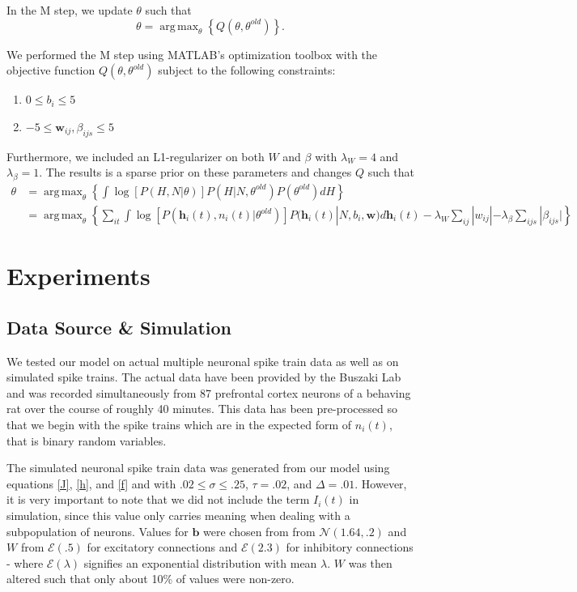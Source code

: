 \documentclass{article}
\DeclareMathOperator*{\argmax}{arg\,max}
\begin{document}
In the M step, we update $\theta$ such that 
\begin{equation}
\label{M} \theta = \argmax_{\theta} \left\{ Q(\theta,\theta^{old}) \right\}.
\end{equation}

We performed the M step using MATLAB's optimization toolbox with the
objective function $Q(\theta,\theta^{old})$ subject to the following constraints:
\begin{enumerate}
\item $0 \leq b_{i} \leq 5$
\item $-5 \leq \mathbf{w}_{ij}, \beta_{ijs} \leq 5$
\end{enumerate}

Furthermore, we included an L1-regularizer on both $W$ and $\beta$ with $\lambda_{W} = 4$ and $\lambda_{\beta} = 1$. The results is a sparse prior on these parameters and changes $Q$ such that
\begin{align*} 
 \label{Q}  
\theta &= \argmax_{\theta} \left\{ \int{ \log\left[P(H,N|\theta)\right] P(H|N,\theta^{old})P(\theta^{old}) dH }\right\}
\\                     &= \argmax_{\theta} \left\{\sum_{it} \int \log\left[P(\mathbf{h}_i(t),n_i(t)|\theta^{old})\right] P(\mathbf{h}_i(t)|N,b_i,\mathbf{w}) d\mathbf{h}_i(t) - \lambda_{W}\sum_{ij}|w_{ij}| - \lambda_{\beta}\sum_{ijs}|\beta_{ijs}|\right\}
\end{align*} 
\section{Experiments}

\subsection{Data Source \& Simulation}

We tested our model on actual multiple neuronal spike train data as well as on simulated spike trains. The actual data have been provided by the Buszaki Lab and was recorded simultaneously from 87 prefrontal cortex neurons of a behaving rat over the course of roughly 40 minutes. This data has been pre-processed so that we begin with the spike trains which are in the expected form of $n_i(t)$, that is binary random variables. 

The simulated neuronal spike train data was generated from our model using equations \eqref{J}, \eqref{h}, and \eqref{f} and with $.02 \leq \sigma \leq .25$, $\tau = .02$, and $\Delta = .01$. However, it is very important to note that we did not include the term $I_i(t)$ in simulation, since this value only carries meaning when dealing with a subpopulation of neurons. Values for $\mathbf{b}$ were chosen from from $\mathcal{N}(1.64,.2)$ and $W$ from $\mathcal{E}(.5)$ for excitatory connections and $\mathcal{E}(2.3)$ for inhibitory connections - where $\mathcal{E}(\lambda)$ signifies an exponential distribution with mean $\lambda$. $W$ was then altered such that only about 10\% of values were non-zero.
\end{document}
